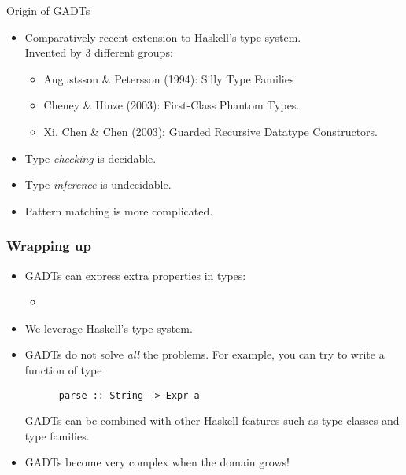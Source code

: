 \documentclass[pdftex,aspectratio=169]{beamer}
\begin{document}
\begin{frame}{Origin of GADTs}
  \begin{itemize}
  \item<1-> Comparatively recent extension to Haskell's type system.\\
    Invented by 3 different groups:
    \begin{itemize}
    \item Augustsson \& Petersson (1994): Silly Type Families
    \item Cheney \& Hinze (2003): First-Class Phantom Types.
    \item Xi, Chen \& Chen (2003): Guarded Recursive Datatype Constructors.
    \end{itemize}
  \item<2-> Type \emph{checking} is decidable.
  \item<3-> Type \emph{inference} is undecidable.
  \item<4-> Pattern matching is more complicated.
  \end{itemize}
  
\end{frame}

\begin{frame}[fragile]
  \frametitle{Wrapping up}
  \begin{itemize}[<+->]
  \item GADTs can express extra properties in types:
    \begin{itemize}
    \item 
    \end{itemize}
  \item We leverage Haskell's type system.
  \item GADTs do not solve \emph{all} the problems.
    For example, you can try to write a function of type
    \begin{lstlisting}
      parse :: String -> Expr a
    \end{lstlisting}
    \pause
    GADTs can be combined with other Haskell features such as type
    classes and type families. 
  \item GADTs become very complex when the domain grows!
  \end{itemize}
\end{frame}
\end{document}

